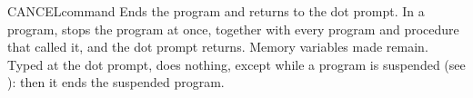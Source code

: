 \begin{XbaseEntry}{CANCEL}{command}
Ends the program and returns to the dot prompt.
\Syntax
{}
\Usage
In a program,  stops the program at once, together with every
program and procedure that called it, and the dot prompt returns.  Memory
variables made  remain.  Typed at the dot prompt, 
does nothing, except while a program is suspended (see ): then it
ends the suspended program.
\end{XbaseEntry}

